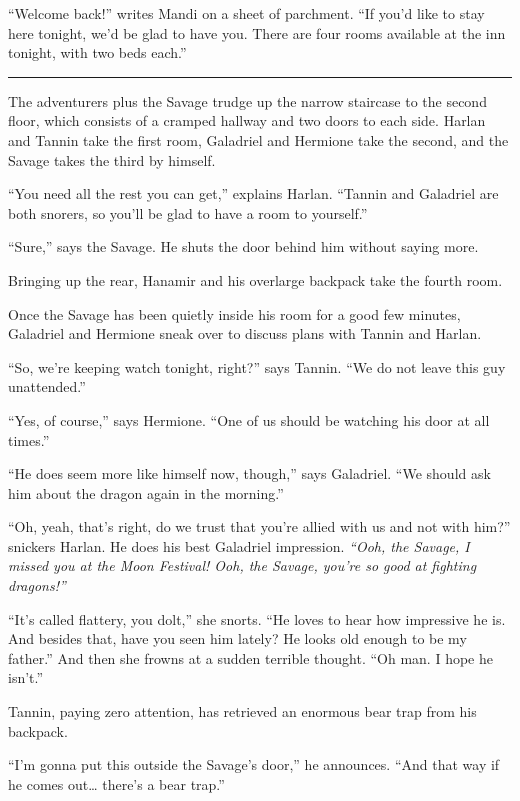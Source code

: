 \documentclass[smalldemyvopaper,11pt,twoside,onecolumn,openright,extrafontsizes]{memoir}
\begin{document}
``Welcome back!'' writes Mandi on a sheet of parchment. ``If you'd like
to stay here tonight, we'd be glad to have you. There are four rooms
available at the inn tonight, with two beds each.''

\begin{center}\rule{0.5\linewidth}{\linethickness}\end{center}

The adventurers plus the Savage trudge up the narrow staircase to the
second floor, which consists of a cramped hallway and two doors to each
side. Harlan and Tannin take the first room, Galadriel and Hermione take
the second, and the Savage takes the third by himself.

``You need all the rest you can get,'' explains Harlan. ``Tannin and
Galadriel are both snorers, so you'll be glad to have a room to
yourself.''

``Sure,'' says the Savage. He shuts the door behind him without saying
more.

Bringing up the rear, Hanamir and his overlarge backpack take the fourth
room.

Once the Savage has been quietly inside his room for a good few minutes,
Galadriel and Hermione sneak over to discuss plans with Tannin and
Harlan.

``So, we're keeping watch tonight, right?'' says Tannin. ``We do not
leave this guy unattended.''

``Yes, of course,'' says Hermione. ``One of us should be watching his
door at all times.''

``He does seem more like himself now, though,'' says Galadriel. ``We
should ask him about the dragon again in the morning.''

``Oh, yeah, that's right, do we trust that you're allied with us and not
with him?'' snickers Harlan. He does his best Galadriel impression.
\emph{``Ooh, the Savage, I missed you at the Moon Festival! Ooh, the
Savage, you're so good at fighting dragons!''}

``It's called flattery, you dolt,'' she snorts. ``He loves to hear how
impressive he is. And besides that, have you seen him lately? He looks
old enough to be my father.'' And then she frowns at a sudden terrible
thought. ``Oh man. I hope he isn't.''

Tannin, paying zero attention, has retrieved an enormous bear trap from
his backpack.

``I'm gonna put this outside the Savage's door,'' he announces. ``And
that way if he comes out\ldots{} there's a bear trap.''
\end{document}
